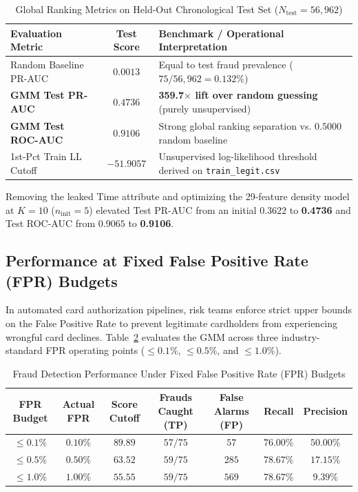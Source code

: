 \documentclass[11pt, a4paper]{article}
\begin{document}
\begin{table}[h!]
\centering
\caption{Global Ranking Metrics on Held-Out Chronological Test Set ($N_{\text{test}} = 56,962$)}
\vspace{0.2cm}
\renewcommand{\arraystretch}{1.25}
\begin{tabular}{lcl}
\toprule
\rowcolor{tableheader}
\textbf{Evaluation Metric} & \textbf{Test Score} & \textbf{Benchmark / Operational Interpretation} \\
\midrule
Random Baseline PR-AUC & $0.0013$ & Equal to test fraud prevalence ($75 / 56,962 = 0.132\%$) \\
\rowcolor{rowalt}
\textbf{GMM Test PR-AUC} & $\mathbf{0.4736}$ & \textbf{359.7$\times$ lift over random guessing} (purely unsupervised) \\
\textbf{GMM Test ROC-AUC} & $\mathbf{0.9106}$ & Strong global ranking separation vs. $0.5000$ random baseline \\
\rowcolor{rowalt}
1st-Pct Train LL Cutoff & $-51.9057$ & Unsupervised log-likelihood threshold derived on \texttt{train\_legit.csv} \\
\bottomrule
\end{tabular}
\label{tab:global_metrics}
\end{table}

Removing the leaked $\text{Time}$ attribute and optimizing the 29-feature density model at $K=10$ ($n_{\text{init}}=5$) elevated Test PR-AUC from an initial $0.3622$ to \textbf{0.4736} and Test ROC-AUC from $0.9065$ to \textbf{0.9106}.

\subsection{Performance at Fixed False Positive Rate (FPR) Budgets}
In automated card authorization pipelines, risk teams enforce strict upper bounds on the False Positive Rate to prevent legitimate cardholders from experiencing wrongful card declines. Table~\ref{tab:fpr_budgets} evaluates the GMM across three industry-standard FPR operating points ($\le 0.1\%$, $\le 0.5\%$, and $\le 1.0\%$).

\begin{table}[h!]
\centering
\caption{Fraud Detection Performance Under Fixed False Positive Rate (FPR) Budgets}
\vspace{0.2cm}
\renewcommand{\arraystretch}{1.25}
\begin{tabular}{ccccccc}
\toprule
\rowcolor{tableheader}
\textbf{FPR Budget} & \textbf{Actual FPR} & \textbf{Score Cutoff} & \textbf{Frauds Caught (TP)} & \textbf{False Alarms (FP)} & \textbf{Recall} & \textbf{Precision} \\
\midrule
$\mathbf{\le 0.1\%}$ & $0.10\%$ & $89.89$ & $57 / 75$ & $57$ & $\mathbf{76.00\%}$ & $\mathbf{50.00\%}$ \\
\rowcolor{rowalt}
$\mathbf{\le 0.5\%}$ & $0.50\%$ & $63.52$ & $59 / 75$ & $285$ & $\mathbf{78.67\%}$ & $17.15\%$ \\
$\mathbf{\le 1.0\%}$ & $1.00\%$ & $55.55$ & $59 / 75$ & $569$ & $\mathbf{78.67\%}$ & $9.39\%$ \\
\bottomrule
\end{tabular}
\label{tab:fpr_budgets}
\end{table}
\end{document}
